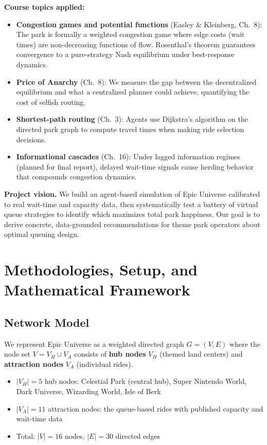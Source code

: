 \documentclass[11pt]{article}
\begin{document}
\textbf{Course topics applied:}
\begin{itemize}[nosep]
    \item \textbf{Congestion games and potential functions} (Easley \& Kleinberg, Ch.~8): The park is formally a weighted congestion game where edge costs (wait times) are non-decreasing functions of flow. Rosenthal's theorem guarantees convergence to a pure-strategy Nash equilibrium under best-response dynamics.
    \item \textbf{Price of Anarchy} (Ch.~8): We measure the gap between the decentralized equilibrium and what a centralized planner could achieve, quantifying the cost of selfish routing.
    \item \textbf{Shortest-path routing} (Ch.~3): Agents use Dijkstra's algorithm on the directed park graph to compute travel times when making ride selection decisions.
    \item \textbf{Informational cascades} (Ch.~16): Under lagged information regimes (planned for final report), delayed wait-time signals cause herding behavior that compounds congestion dynamics.
\end{itemize}

\textbf{Project vision.} We build an agent-based simulation of Epic Universe calibrated to real wait-time and capacity data, then systematically test a battery of virtual queue strategies to identify which maximizes total park happiness. Our goal is to derive concrete, data-grounded recommendations for theme park operators about optimal queuing design.

\section{Methodologies, Setup, and Mathematical Framework}

\subsection{Network Model}

We represent Epic Universe as a weighted directed graph $G = (V, E)$ where the node set $V = V_H \cup V_A$ consists of \textbf{hub nodes} $V_H$ (themed land centers) and \textbf{attraction nodes} $V_A$ (individual rides).

\begin{itemize}[nosep]
    \item $|V_H| = 5$ hub nodes: Celestial Park (central hub), Super Nintendo World, Dark Universe, Wizarding World, Isle of Berk
    \item $|V_A| = 11$ attraction nodes: the queue-based rides with published capacity and wait-time data
    \item Total: $|V| = 16$ nodes, $|E| = 30$ directed edges
\end{itemize}
\end{document}
